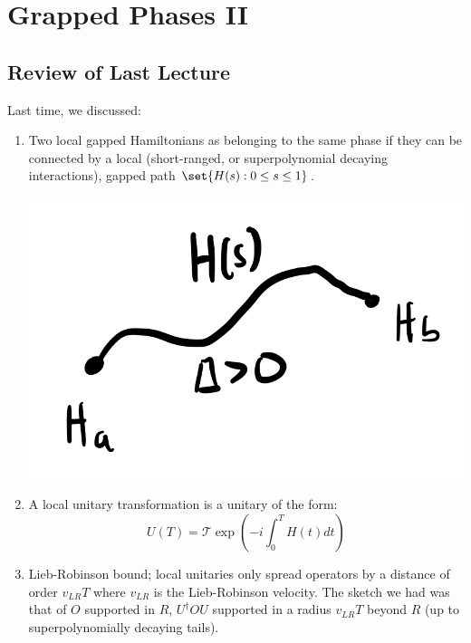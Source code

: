 \section{Grapped Phases II}
\subsection{Review of Last Lecture}
Last time, we discussed:
\begin{enumerate}
    \item Two local gapped Hamiltonians as belonging to the same phase if they can be connected by a local (short-ranged, or superpolynomial decaying interactions), gapped path $\set{H(s): 0 \leq s \leq 1}$.
    \begin{center}
        \includegraphics[scale=0.35]{Lectures/Images/lec11-interpolation.png}
    \end{center}
    \item A local unitary transformation is a unitary of the form:
    \begin{equation}
        U(T) = \mathcal{T}\exp(-i\int_0^T H(t)dt)
    \end{equation}
    \item Lieb-Robinson bound; local unitaries only spread operators by a distance of order $v_{LR}T$ where $v_{LR}$ is the Lieb-Robinson velocity. The sketch we had was that of $O$ supported in $R$, $U^\dag O U$ supported in a radius $v_{LR}T$ beyond $R$ (up to superpolynomially decaying tails).
    \begin{center}

\end{center}
\end{enumerate}
